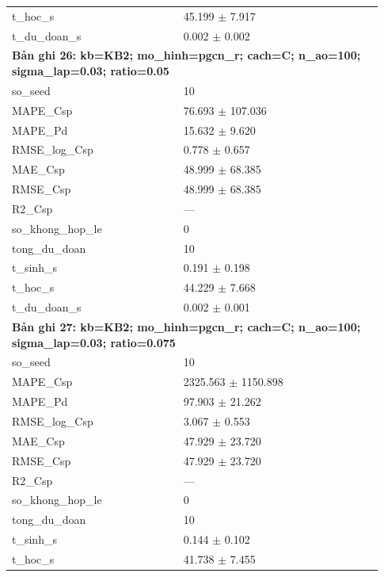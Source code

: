 \begin{longtable}{p{0.43\linewidth}p{0.50\linewidth}}
t\_\allowbreak hoc\_\allowbreak s & 45.199 $\pm$ 7.917 \\
t\_\allowbreak du\_\allowbreak doan\_\allowbreak s & 0.002 $\pm$ 0.002 \\
\midrule
\multicolumn{2}{p{0.95\linewidth}}{\textbf{Bản ghi 26: kb=KB2; mo\_hinh=pgcn\_r; cach=C; n\_ao=100; sigma\_lap=0.03; ratio=0.05}} \\
so\_\allowbreak seed & 10 \\
MAPE\_\allowbreak Csp & 76.693 $\pm$ 107.036 \\
MAPE\_\allowbreak Pd & 15.632 $\pm$ 9.620 \\
RMSE\_\allowbreak log\_\allowbreak Csp & 0.778 $\pm$ 0.657 \\
MAE\_\allowbreak Csp & 48.999 $\pm$ 68.385 \\
RMSE\_\allowbreak Csp & 48.999 $\pm$ 68.385 \\
R2\_\allowbreak Csp & — \\
so\_\allowbreak khong\_\allowbreak hop\_\allowbreak le & 0 \\
tong\_\allowbreak du\_\allowbreak doan & 10 \\
t\_\allowbreak sinh\_\allowbreak s & 0.191 $\pm$ 0.198 \\
t\_\allowbreak hoc\_\allowbreak s & 44.229 $\pm$ 7.668 \\
t\_\allowbreak du\_\allowbreak doan\_\allowbreak s & 0.002 $\pm$ 0.001 \\
\midrule
\multicolumn{2}{p{0.95\linewidth}}{\textbf{Bản ghi 27: kb=KB2; mo\_hinh=pgcn\_r; cach=C; n\_ao=100; sigma\_lap=0.03; ratio=0.075}} \\
so\_\allowbreak seed & 10 \\
MAPE\_\allowbreak Csp & 2325.563 $\pm$ 1150.898 \\
MAPE\_\allowbreak Pd & 97.903 $\pm$ 21.262 \\
RMSE\_\allowbreak log\_\allowbreak Csp & 3.067 $\pm$ 0.553 \\
MAE\_\allowbreak Csp & 47.929 $\pm$ 23.720 \\
RMSE\_\allowbreak Csp & 47.929 $\pm$ 23.720 \\
R2\_\allowbreak Csp & — \\
so\_\allowbreak khong\_\allowbreak hop\_\allowbreak le & 0 \\
tong\_\allowbreak du\_\allowbreak doan & 10 \\
t\_\allowbreak sinh\_\allowbreak s & 0.144 $\pm$ 0.102 \\
t\_\allowbreak hoc\_\allowbreak s & 41.738 $\pm$ 7.455 \\

\end{longtable}
